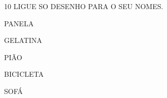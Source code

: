 \begin{escola}
\num{10} LIGUE SO DESENHO PARA O SEU NOMES.

PANELA%

GELATINA%

PIÃO%

BICICLETA%

SOFÁ%








\end{escola}
